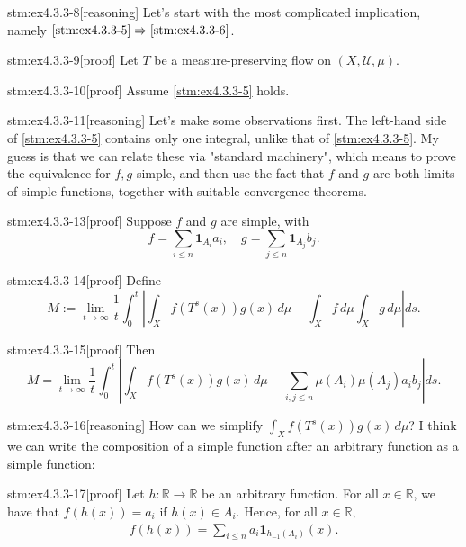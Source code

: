 \begin{stm}{stm:ex4.3.3-8}[reasoning]
Let's start with the most complicated implication, namely $\ref{stm:ex4.3.3-5} \Rightarrow \ref{stm:ex4.3.3-6}$.
\end{stm}

\begin{stm}{stm:ex4.3.3-9}[proof]
Let $T$ be a measure-preserving flow on $(X, \mathcal{U}, \mu)$.
\end{stm}

\begin{stm}{stm:ex4.3.3-10}[proof]
Assume \ref{stm:ex4.3.3-5} holds.
\end{stm}

\begin{stm}{stm:ex4.3.3-11}[reasoning]
Let's make some observations first. The left-hand side of \ref{stm:ex4.3.3-5} contains only one integral, unlike that of \ref{stm:ex4.3.3-5}. My guess is that we can relate these via "standard machinery", which means to prove the equivalence for $f, g$ simple, and then use the fact that $f$ and $g$ are both limits of simple functions, together with suitable convergence theorems.
\end{stm}

\begin{stm}{stm:ex4.3.3-13}[proof]
Suppose $f$ and $g$ are simple, with 
\[
f = \sum_{i \leq n} \mathbf{1}_{A_i} a_i, \quad g = \sum_{j \leq n} \mathbf{1}_{A_j} b_j.
\]
\end{stm}

\begin{stm}{stm:ex4.3.3-14}[proof]
Define
\[
M:= \lim_{t \to \infty} \frac{1}{t} \int_0^t \left| \int_X f(T^s(x))g(x) \, d\mu - \int_X f \, d\mu \int_X g \, d\mu \right| ds.
\]
\end{stm}

\begin{stm}{stm:ex4.3.3-15}[proof]
Then
\[
M= \lim_{t \to \infty} \frac{1}{t} \int_0^t \left| \int_X f(T^s(x))g(x) \, d\mu - \sum_{i,j \leq n} \mu(A_i) \mu(A_j) a_i b_j \right| ds.
\]
\end{stm}

\begin{stm}{stm:ex4.3.3-16}[reasoning]
How can we simplify $\int_X f(T^s(x)) g(x) \, d\mu$? I think we can write the composition of a simple function after an arbitrary function as a simple function:
\end{stm}

\begin{stm}{stm:ex4.3.3-17}[proof]
Let $h: \mathbb{R} \to \mathbb{R}$ be an arbitrary function. For all $x \in \mathbb{R}$, we have that $f(h(x)) = a_i$ if $h(x) \in A_i$. Hence, for all $x \in \mathbb{R}$,
\begin{align*}
f(h(x)) = \sum_{i \leq n} a_i \mathbf{1}_{h_{-1}(A_i)}(x).
\end{align*}

\end{stm}

